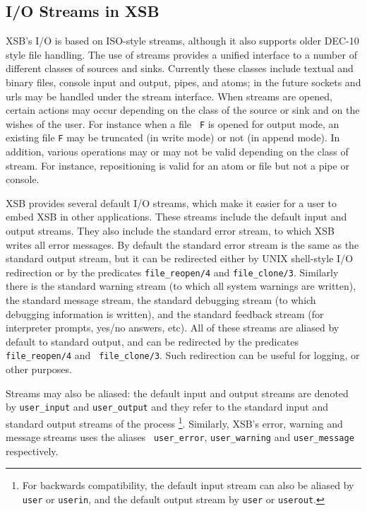 \subsection{I/O Streams in XSB}
XSB's I/O is based on ISO-style streams, although it also supports
older DEC-10 style file handling.  The use of streams provides a
unified interface to a number of different classes of sources and
sinks.  Currently these classes include textual and binary files,
console input and output, pipes, and atoms; in the future sockets and
urls may be handled under the stream interface.  When streams are
opened, certain actions may occur depending on the class of the source
or sink and on the wishes of the user.  For instance when a file {\tt
F} is opened for output mode, an existing file {\tt F} may be
truncated (in write mode) or not (in append mode).  In addition,
various operations may or may not be valid depending on the class of
stream.  For instance, repositioning is valid for an atom or file but
not a pipe or console.

XSB provides several default I/O streams, which make it easier for a
user to embed XSB in other applications.  These streams include the
default input and output streams.  They also include the standard
error stream, to which XSB writes all error messages.  By default the
standard error stream is the same as the standard output stream, but
it can be redirected either by UNIX shell-style I/O redirection or by
the predicates {\tt file\_reopen/4} and {\tt file\_clone/3}.
Similarly there is the standard warning stream (to which all system
warnings are written), the standard message stream, the standard
debugging stream (to which debugging information is written), and the
standard feedback stream (for interpreter prompts, yes/no answers,
etc).  All of these streams are aliased by default to standard output,
and can be redirected by the predicates {\tt file\_reopen/4} and {\tt
  file\_clone/3}.  Such redirection can be useful for logging, or
other purposes.


Streams may also be aliased: the default input and output streams are
denoted by {\tt user\_input} and {\tt user\_output} and they refer to
the standard input and standard output streams of the
process \footnote{For backwards compatibility, the default input
  stream can also be aliased by {\tt user} or {\tt userin}, and the
  default output stream by {\tt user} or {\tt userout}.}.  Similarly,
XSB's error, warning and message streams uses the aliases {\tt
  user\_error}, {\tt user\_warning} and {\tt user\_message}
respectively.

